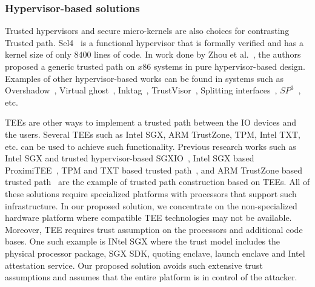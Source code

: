 
\subsubsection{Hypervisor-based solutions} Trusted hypervisors and secure micro-kernels are also choices for contrasting Trusted path. Sel4~\cite{klein2009sel4} is a functional hypervisor that is formally verified and has a kernel size of only $8400$ lines of code. In work done by Zhou et al.~\cite{zhou2012building}, the authors proposed a generic trusted path on $x86$ systems in pure hypervisor-based design. Examples of other hypervisor-based works can be found in systems such as Overshadow~\cite{Overshadow}, Virtual ghost~\cite{criswell2014virtual}, Inktag~\cite{hofmann2013inktag}, TrustVisor~\cite{mccune2010trustvisor}, Splitting interfaces~\cite{ta2006splitting}, $SP^3$~\cite{yang2008using}, etc.

 TEEs are other ways to implement a trusted path between the IO devices and the users. Several TEEs such as Intel SGX, ARM TrustZone, TPM, Intel TXT, etc. can be used to achieve such functionality. Previous research works such as Intel SGX and trusted hypervisor-based SGXIO~\cite{weiser2017sgxio}, Intel SGX based ProximiTEE~\cite{dhar2018proximitee}, TPM and TXT based trusted path~\cite{filyanov2011uni}, and ARM TrustZone based trusted path~\cite{filyanov2011uni,sun2015trustotp} are the example of trusted path construction based on TEEs. All of these solutions require specialized platforms with processors that support such infrastructure. In our proposed solution, we concentrate on the non-specialized hardware platform where compatible TEE technologies may not be available.
Moreover, TEE requires trust assumption on the processors and additional code bases. One such example is INtel SGX where the trust model includes the physical processor package, SGX SDK, quoting enclave, launch enclave and Intel attestation service. Our proposed solution avoids such extensive trust assumptions and assumes that the entire platform is in control of the attacker.


